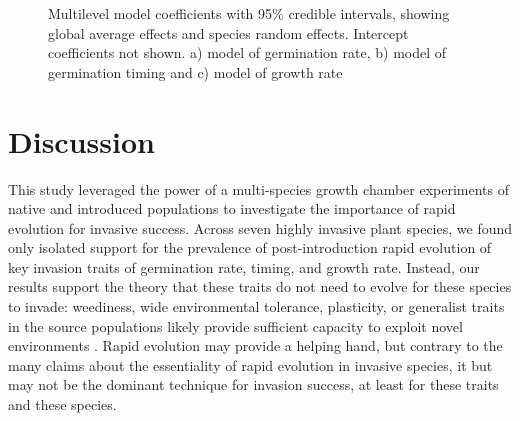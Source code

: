 \documentclass[12pt]{article}\usepackage[]{graphicx}\usepackage[]{color}
\begin{document}
\begin{figure}
	\caption{Multilevel model coefficients with 95\% credible intervals, showing global average effects and species random effects. Intercept coefficients not shown.  a) model of germination rate, b) model of germination timing and c) model of growth rate}
	\label{fig:coef}
\end{figure}

	\section{Discussion} %
	
	This study leveraged the power of a multi-species growth chamber experiments of native and introduced populations to investigate the importance of rapid evolution for invasive success. Across seven highly invasive plant species, we found only isolated support for the prevalence of post-introduction rapid evolution of key invasion traits of germination rate, timing, and growth rate. Instead, our results support the theory that these traits do not need to evolve for these species to invade: weediness, wide environmental tolerance, plasticity, or generalist traits in the source populations likely provide sufficient capacity to exploit novel environments \parencite{Baker1965}. Rapid evolution may provide a helping hand, but contrary to the many claims about the essentiality of rapid evolution in invasive species, it but may not be the dominant technique for invasion success, at least for these traits and these species. 
	
\end{document}
